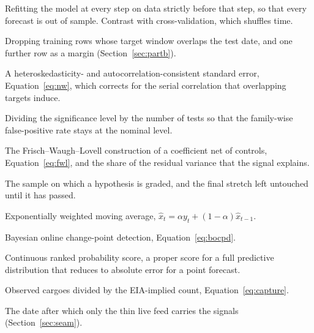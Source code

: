 \begin{description}[nosep,leftmargin=0em,style=unboxed,font=\normalfont\itshape]
\item[Walk-forward.] Refitting the model at every step on data strictly before that
  step, so that every forecast is out of sample. Contrast with cross-validation,
  which shuffles time.
\item[Purge and embargo.] Dropping training rows whose target window overlaps the
  test date, and one further row as a margin (Section~\ref{sec:partb}).
\item[HAC, Newey--West.] A heteroskedasticity- and autocorrelation-consistent
  standard error, Equation~\eqref{eq:nw}, which corrects for the serial correlation
  that overlapping targets induce.
\item[Bonferroni.] Dividing the significance level by the number of tests so that
  the family-wise false-positive rate stays at the nominal level.
\item[FWL, partial effect, partial \Rsq.] The Frisch--Waugh--Lovell construction of
  a coefficient net of controls, Equation~\eqref{eq:fwl}, and the share of the
  residual variance that the signal explains.
\item[Discovery, holdout.] The sample on which a hypothesis is graded, and the
  final stretch left untouched until it has passed.
\item[EWMA.] Exponentially weighted moving average, $\hat{x}_t = \alpha y_t + (1-\alpha)\hat{x}_{t-1}$.
\item[BOCPD.] Bayesian online change-point detection, Equation~\eqref{eq:bocpd}.
\item[CRPS.] Continuous ranked probability score, a proper score for a full
  predictive distribution that reduces to absolute error for a point forecast.
\item[Capture rate.] Observed cargoes divided by the EIA-implied count,
  Equation~\eqref{eq:capture}.
\item[Coverage seam.] The date after which only the thin live feed carries the
  signals (Section~\ref{sec:seam}).
\end{description}
